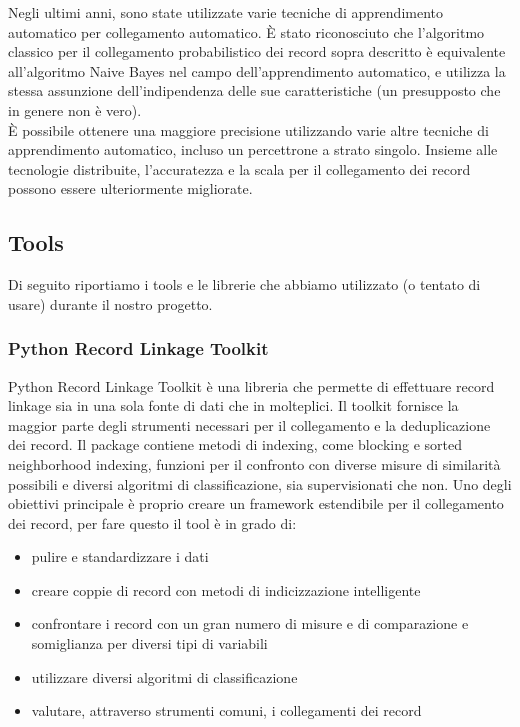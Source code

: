 \documentclass[a4paper,12pt]{article}
\begin{document}
\begin{description}[align=left]
	\item[Machine learning] Negli ultimi anni, sono state utilizzate varie tecniche di apprendimento automatico per collegamento automatico. È stato riconosciuto che l'algoritmo classico per il collegamento probabilistico dei record sopra descritto è equivalente all'algoritmo Naive Bayes nel campo dell'apprendimento automatico, e utilizza la stessa assunzione dell'indipendenza delle sue caratteristiche (un presupposto che in genere non è vero).\\È possibile ottenere una maggiore precisione utilizzando varie altre tecniche di apprendimento automatico, incluso un percettrone a strato singolo. Insieme alle tecnologie distribuite, l'accuratezza e la scala per il collegamento dei record possono essere ulteriormente migliorate.	
\end{description}

\subsection{Tools}
Di seguito riportiamo i tools e le librerie che abbiamo utilizzato (o tentato di usare) durante il nostro progetto.

\subsubsection{Python Record Linkage Toolkit}
Python Record Linkage Toolkit è una libreria che permette di effettuare record linkage sia in una sola fonte di dati che in molteplici. Il toolkit fornisce la maggior parte degli strumenti necessari per il collegamento e la deduplicazione dei record.
 Il package contiene metodi di indexing, come blocking e sorted neighborhood indexing, funzioni per il confronto con diverse misure di similarità possibili e diversi algoritmi di classificazione, sia supervisionati che non. 
Uno degli obiettivi principale è proprio creare un framework estendibile per il collegamento dei record, per fare questo il tool è in grado di:
\newpage
\begin{itemize}
\item pulire e standardizzare i dati
\item creare coppie di record con metodi di indicizzazione intelligente
\item confrontare i record con un gran numero di misure e di comparazione e somiglianza per diversi tipi di variabili
\item utilizzare diversi algoritmi di classificazione
\item valutare, attraverso strumenti comuni, i collegamenti dei record
\end{itemize} 
\end{document}
